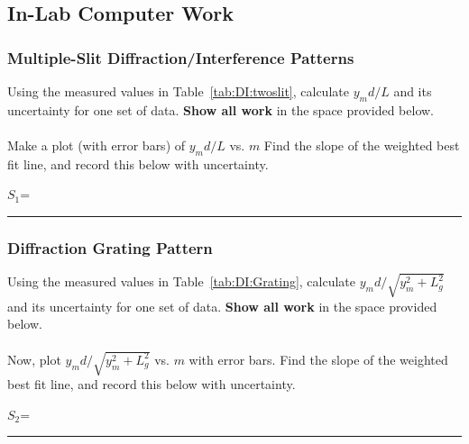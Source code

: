 \clearpage

\subsection{In-Lab Computer Work}


\subsubsection{Multiple-Slit Diffraction/Interference Patterns}

Using the measured values in Table~\ref{tab:DI:twoslit}, calculate
$y_md/L$ and its uncertainty for one set of data.  
{\bf Show all work} in the space provided
below. \\
\vspace*{4cm} \\
\noindent Make a plot (with error bars) of $y_md/L$ vs. $m$ 
Find the slope of the weighted best fit line, and record this
below with uncertainty.

\begin{center}
$S_1$=~ \rule{3cm}{.1mm}
\end{center}


\subsubsection{Diffraction Grating Pattern}

Using the measured values in Table~\ref{tab:DI:Grating}, calculate
$y_md/ \sqrt{y_m^2 + L_g^2}$ and its uncertainty for one set of data.  
{\bf Show all work} in the space provided below. \\
\vspace*{5cm} \\

\noindent Now, plot $y_md/ \sqrt{y_m^2 + L_g^2}$ vs. $m$ with error bars. 
Find the
slope of the weighted best fit line, and record this below with
uncertainty.

\begin{center}
$S_2$=~ \rule{3cm}{.1mm}
\end{center}

